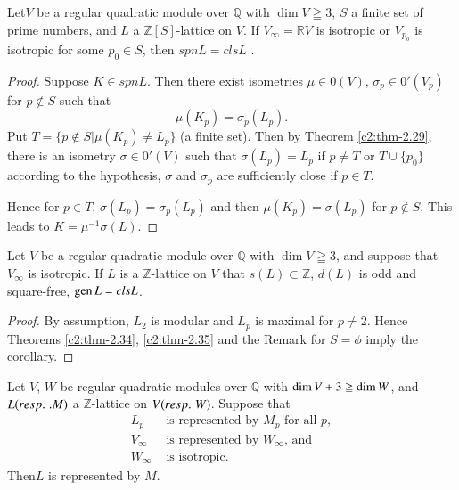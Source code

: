 \begin{theorem}\label{c2:thm-2.35} 
Let\pageoriginale $V$ be a regular quadratic module over $\mathbb{Q}$
with $\dim V\geqq 3$, $S$ a finite set of prime numbers, and $L$ a
$\mathbb{Z}[S]$-lattice on $V$. If $V_{\infty} = \mathbb{R} V$ is
isotropic or $V_{p_o}$ is isotropic for some $p_0 \in S$, then
$spn L = cls L$ .
\end{theorem}

\begin{proof}
Suppose $K\in spn L$. Then there exist isometries
$\mu \in 0(V)$, $\sigma_p \in 0' (V_p)$ for $p\not\in
S$ such that 
$$
\mu(K_p) = \sigma_p (L_p).
$$
Put $T = \{ p\not\in S|\mu(K_p) \neq L_p\}$ (a finite set). Then by
Theorem \ref{c2:thm-2.29}, there is an isometry $\sigma \in 0'(V)$ such
that $\sigma (L_p) =L_p$ if $p \neq T$ or $T \cup \{p_0\}$ according
to the hypothesis, $\sigma$ and $\sigma_p$ are sufficiently close if
$p\in T$.

Hence for $p \in T$, $\sigma(L_p) = \sigma_p (L_p)$ and then
$\mu(K_p) =\sigma(L_p)$ for $p\not\in S$. This leads to
$K=\mu^{-1}\sigma(L)$.
\end{proof}

\setcounter{cor}{0}
\begin{cor}%
Let $V$ be a regular quadratic module over $\mathbb{Q}$ with $\dim
V \geqq 3$, and suppose that $V_{\infty}$ is isotropic. If $L$ is a
$\mathbb{Z}$-lattice on $V$ that $s(L)\subset \mathbb{Z}$, $d(L)$ is
odd and square-free, $\operatorname{gen} L=cls L$.
\end{cor}

\begin{proof}
By assumption, $L_2$ is modular and $L_p$ is maximal for $p\neq
2$. Hence Theorems \ref{c2:thm-2.34}, \ref{c2:thm-2.35} and the Remark for
$S=\phi$ imply the 
corollary. 
\end{proof}

\begin{cor}
Let $V$, $W$ be regular quadratic modules over $\mathbb{Q}$ with $\dim\break
V + 3 \geqq \dim W$, and $L({resp.}\kern.3em. M)$ a $\mathbb{Z}$-lattice on $V
({resp.}\kern.3em W)$. Suppose that 
\begin{align*}
L_p & \text{ is represented by } M_p \text{ for all } p,\\
V_{\infty} & \text{ is represented by $W_{\infty}$, and}\\
W_{\infty} & \text{ is isotropic}. 
\end{align*}
Then\pageoriginale $L$ is represented by $M$.
\end{cor}

